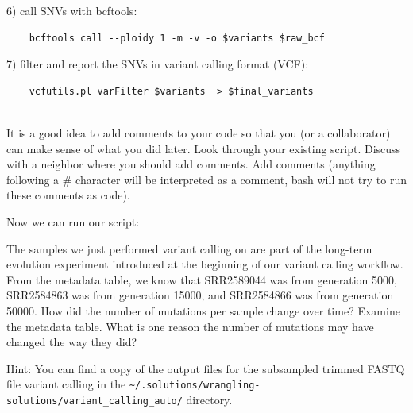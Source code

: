 \documentclass[
  letterpaper,
  DIV=11,
  numbers=noendperiod]{scrreprt}
\newenvironment{Shaded}{\begin{snugshade}}{\end{snugshade}}
\newcommand{\ExtensionTok}[1]{\textcolor[rgb]{0.00,0.23,0.31}{#1}}
\newcommand{\NormalTok}[1]{\textcolor[rgb]{0.00,0.23,0.31}{#1}}
\begin{document}
6) call SNVs with bcftools:

\begin{verbatim}
    bcftools call --ploidy 1 -m -v -o $variants $raw_bcf 
\end{verbatim}

7) filter and report the SNVs in variant calling format (VCF):

\begin{verbatim}
    vcfutils.pl varFilter $variants  > $final_variants
    
\end{verbatim}

\begin{tcolorbox}[enhanced jigsaw, toptitle=1mm, breakable, bottomrule=.15mm, colback=white, toprule=.15mm, opacityback=0, bottomtitle=1mm, coltitle=black, opacitybacktitle=0.6, rightrule=.15mm, colframe=quarto-callout-caution-color-frame, titlerule=0mm, colbacktitle=quarto-callout-caution-color!10!white, title={Exercise}, left=2mm, leftrule=.75mm, arc=.35mm]

It is a good idea to add comments to your code so that you (or a
collaborator) can make sense of what you did later. Look through your
existing script. Discuss with a neighbor where you should add comments.
Add comments (anything following a \# character will be interpreted as a
comment, bash will not try to run these comments as code).

\end{tcolorbox}

Now we can run our script:

\begin{Shaded}
\end{Shaded}

\begin{tcolorbox}[enhanced jigsaw, toptitle=1mm, breakable, bottomrule=.15mm, colback=white, toprule=.15mm, opacityback=0, bottomtitle=1mm, coltitle=black, opacitybacktitle=0.6, rightrule=.15mm, colframe=quarto-callout-caution-color-frame, titlerule=0mm, colbacktitle=quarto-callout-caution-color!10!white, title={Exercise}, left=2mm, leftrule=.75mm, arc=.35mm]

The samples we just performed variant calling on are part of the
long-term evolution experiment introduced at the beginning of our
variant calling workflow. From the metadata table, we know that
SRR2589044 was from generation 5000, SRR2584863 was from generation
15000, and SRR2584866 was from generation 50000. How did the number of
mutations per sample change over time? Examine the metadata table. What
is one reason the number of mutations may have changed the way they did?

Hint: You can find a copy of the output files for the subsampled trimmed
FASTQ file variant calling in the
\texttt{\textasciitilde{}/.solutions/wrangling-solutions/variant\_calling\_auto/}
directory.

\end{tcolorbox}
\end{document}
